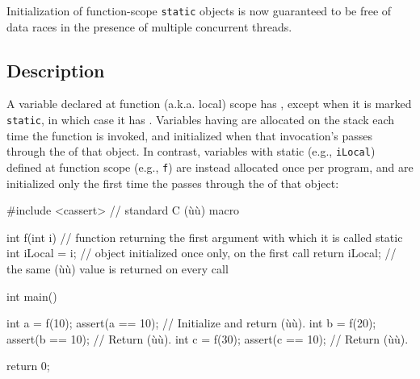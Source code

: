 


\setcounter{table}{0}
\setcounter{footnote}{0}
\setcounter{lstlisting}{0}


Initialization of function-scope \lstinline!static! objects is now guaranteed to be
free of data races in the presence
of multiple concurrent threads.

\subsection[Description]{Description}\label{description-functionstatic}

A variable declared at function (a.k.a. local) scope has , 
except when it is marked \lstinline!static!, in which case it has .
Variables having  are allocated on the stack
each time the function is invoked, and initialized when that invocation's 
passes through the  of that object.
In contrast, variables with static  (e.g., \lstinline!iLocal!)
defined at function scope (e.g., \lstinline!f!) are instead allocated once per program, and are initialized
only the first time the  passes
through the  of that object:

\begin{emcppslisting}
#include <cassert>  // standard C (ù{}ù) macro

int f(int i) // function returning the first argument with which it is called
{
    static int iLocal = i;  // object initialized once only, on the first call
    return iLocal;          // the same (ù{}ù) value is returned on every call
}

int main()
{
    int a = f(10);  assert(a == 10);  // Initialize and return (ù{}ù).
    int b = f(20);  assert(b == 10);  // Return (ù{}ù).
    int c = f(30);  assert(c == 10);  // Return (ù{}ù).

    return 0;
}
\end{emcppslisting}

